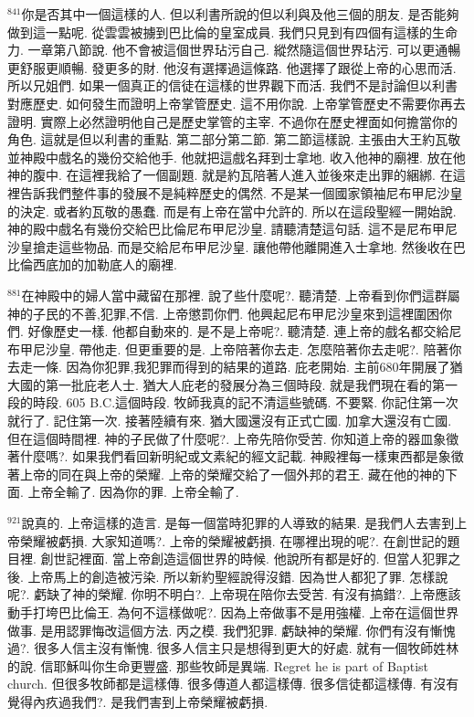 \documentclass{book}
\begin{document}
$^{841}$你是否其中一個這樣的人.
但以利書所說的但以利與及他三個的朋友.
是否能夠做到這一點呢.
從雲雲被擄到巴比倫的皇室成員.
我們只見到有四個有這樣的生命力.
一章第八節說.
他不會被這個世界玷污自己.
縱然隨這個世界玷污.
可以更通暢更舒服更順暢.
發更多的財.
他沒有選擇過這條路.
他選擇了跟從上帝的心思而活.
所以兄姐們.
如果一個真正的信徒在這樣的世界觀下而活.
我們不是討論但以利書對應歷史.
如何發生而證明上帝掌管歷史.
這不用你說.
上帝掌管歷史不需要你再去證明.
實際上必然證明他自己是歷史掌管的主宰.
不過你在歷史裡面如何擔當你的角色.
這就是但以利書的重點.
第二部分第二節.
第二節這樣說.
主張由大王約瓦敬並神殿中戲名的幾份交給他手.
他就把這戲名拜到士拿地.
收入他神的廟裡.
放在他神的腹中.
在這裡我給了一個副題.
就是約瓦陪著人進入並後來走出罪的綑綁.
在這裡告訴我們整件事的發展不是純粹歷史的偶然.
不是某一個國家領袖尼布甲尼沙皇的決定.
或者約瓦敬的愚蠢.
而是有上帝在當中允許的.
所以在這段聖經一開始說.
神的殿中戲名有幾份交給巴比倫尼布甲尼沙皇.
請聽清楚這句話.
這不是尼布甲尼沙皇搶走這些物品.
而是交給尼布甲尼沙皇.
讓他帶他離開進入士拿地.
然後收在巴比倫西底加的加勒底人的廟裡.

$^{881}$在神殿中的婦人當中藏留在那裡.
說了些什麼呢?.
聽清楚.
上帝看到你們這群屬神的子民的不善,犯罪,不信.
上帝懲罰你們.
他興起尼布甲尼沙皇來到這裡圍困你們.
好像歷史一樣.
他都自動來的.
是不是上帝呢?.
聽清楚.
連上帝的戲名都交給尼布甲尼沙皇.
帶他走.
但更重要的是.
上帝陪著你去走.
怎麼陪著你去走呢?.
陪著你去走一條.
因為你犯罪,我犯罪而得到的結果的道路.
庇老開始.
主前680年開展了猶大國的第一批庇老人士.
猶大人庇老的發展分為三個時段.
就是我們現在看的第一段的時段.
605 B.C.這個時段.
牧師我真的記不清這些號碼.
不要緊.
你記住第一次就行了.
記住第一次.
接著陸續有來.
猶大國還沒有正式亡國.
加拿大還沒有亡國.
但在這個時間裡.
神的子民做了什麼呢?.
上帝先陪你受苦.
你知道上帝的器皿象徵著什麼嗎?.
如果我們看回新明紀或文素紀的經文記載.
神殿裡每一樣東西都是象徵著上帝的同在與上帝的榮耀.
上帝的榮耀交給了一個外邦的君王.
藏在他的神的下面.
上帝全輸了.
因為你的罪.
上帝全輸了.

$^{921}$說真的.
上帝這樣的造言.
是每一個當時犯罪的人導致的結果.
是我們人去害到上帝榮耀被虧損.
大家知道嗎?.
上帝的榮耀被虧損.
在哪裡出現的呢?.
在創世記的題目裡.
創世記裡面.
當上帝創造這個世界的時候.
他說所有都是好的.
但當人犯罪之後.
上帝馬上的創造被污染.
所以新約聖經說得沒錯.
因為世人都犯了罪.
怎樣說呢?.
虧缺了神的榮耀.
你明不明白?.
上帝現在陪你去受苦.
有沒有搞錯?.
上帝應該動手打垮巴比倫王.
為何不這樣做呢?.
因為上帝做事不是用強權.
上帝在這個世界做事.
是用認罪悔改這個方法.
丙之模.
我們犯罪.
虧缺神的榮耀.
你們有沒有慚愧過?.
很多人信主沒有慚愧.
很多人信主只是想得到更大的好處.
就有一個牧師姓林的說.
信耶穌叫你生命更豐盛.
那些牧師是異端.
Regret he is part of Baptist church.
但很多牧師都是這樣傳.
很多傳道人都這樣傳.
很多信徒都這樣傳.
有沒有覺得內疚過我們?.
是我們害到上帝榮耀被虧損.
\end{document}
